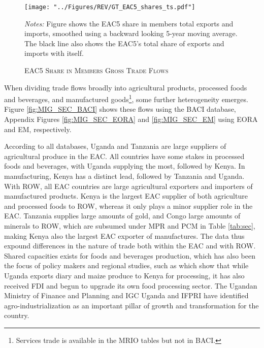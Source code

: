 \documentclass[a4paper]{article}
\begin{document}
\begin{figure}[h!] %
\centering
\caption{\label{fig:GTEACshares}\textsc{EAC5 Share in Members Gross Trade Flows}}
\texttt{[image: "../Figures/REV/GT\_EAC5\_shares\_ts.pdf"]} \\ %
\raggedright
\scriptsize 
\emph{Notes:} Figure shows the EAC5 share in members total exports and imports, smoothed using a backward looking 5-year moving average. The black line also shows the EAC5's total share of exports and imports with itself.
\end{figure}
\FloatBarrier


When dividing trade flows broadly into agricultural products, processed foods and beverages, and manufactured goods\footnote{Services trade is available in the MRIO tables but not in BACI. \vspace{-5mm}}, some further heterogeneity emerges. Figure \ref{fig:MIG_SEC_BACI} shows these flows using the BACI database, Appendix Figures \ref{fig:MIG_SEC_EORA} and \ref{fig:MIG_SEC_EM} using EORA and EM, respectively. \newline 

According to all databases, Uganda and Tanzania are large suppliers of agricultural produce in the EAC. All countries have some stakes in processed foods and beverages, with Uganda supplying the most, followed by Kenya. In manufacturing, Kenya has a distinct lead, followed by Tanzania and Uganda. With ROW, all EAC countries are large agricultural exporters and importers of manufactured products. Kenya is the largest EAC supplier of both agriculture and processed foods to ROW, whereas it only plays a minor supplier role in the EAC. Tanzania supplies large amounts of gold, and Congo large amounts of minerals to ROW, which are subsumed under MPR and PCM in Table \ref{tab:sec}, making Kenya also the largest EAC exporter of manufactures. The data thus expound differences in the nature of trade both within the EAC and with ROW. Shared capacities exists for foods and beverages production, which has also been the focus of policy makers and regional studies, such as \citet{Daly2017RVCs} which show that while Uganda exports diary and maize produce to Kenya for processing, it has also received FDI and begun to upgrade its own food processing sector. The Ugandan Ministry of Finance and Planning and IGC Uganda \citep{EGF21, fowler2019agro} and IFPRI \citep{van2020institutional} have identified agro-industrialization as an important pillar of growth and transformation for the country. 
\end{document}
